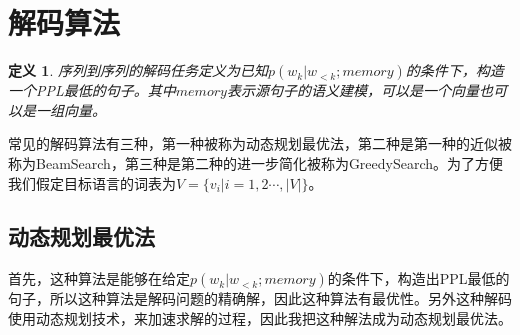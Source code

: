 \documentclass[twoside,a4paper,12pt]{book}%
\newtheorem{definition}{定义}
\begin{document}
\section{解码算法}
\begin{definition}
序列到序列的解码任务定义为已知$p(w_k|w_{<k};memory)$的条件下，构造一个PPL最低的句子。其中$memory$表示源句子的语义建模，可以是一个向量也可以是一组向量。
\end{definition}
常见的解码算法有三种，第一种被称为动态规划最优法，第二种是第一种的近似被称为BeamSearch，第三种是第二种的进一步简化被称为GreedySearch。为了方便我们假定目标语言的词表为$V=\{v_i|i=1,2\cdots,|V|\}$。
\subsection{动态规划最优法}
首先，这种算法是能够在给定$p(w_k|w_{<k};memory)$的条件下，构造出PPL最低的句子，所以这种算法是解码问题的精确解，因此这种算法有最优性。另外这种解码使用动态规划技术，来加速求解的过程，因此我把这种解法成为动态规划最优法。
\end{document}
